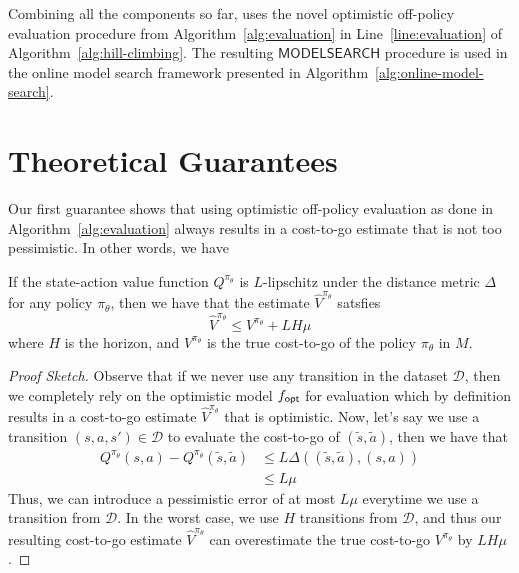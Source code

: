 Combining all the components so far, \taml{} uses the novel optimistic
off-policy evaluation procedure from Algorithm~\ref{alg:evaluation} in
Line~\ref{line:evaluation} of Algorithm~\ref{alg:hill-climbing}. The
resulting $\mathsf{MODELSEARCH}$ procedure is used in the online model
search framework presented in Algorithm~\ref{alg:online-model-search}.

\section{Theoretical Guarantees}
\label{sec:theor-guar}

Our first guarantee shows that using optimistic off-policy evaluation
as done in Algorithm~\ref{alg:evaluation} always results in a
cost-to-go estimate that is not too pessimistic. In other words, we
have
\begin{theorem}
  If the state-action value function $Q^{\pi_\theta}$ is $L$-lipschitz
  under the 
  distance metric $\Delta$ for any policy $\pi_\theta$, then we have
  that the estimate $\hat{V}^{\pi_\theta}$ satsfies
  \begin{equation}
    \label{eq:25}
    \hat{V}^{\pi_\theta} \leq V^{\pi_\theta} + LH\mu
  \end{equation}
  where $H$ is the horizon, and $V^{\pi_\theta}$ is the true
  cost-to-go of the policy $\pi_\theta$ in $M$.
  \label{theorem:lipschitz}
\end{theorem}
\begin{proof}[Proof Sketch]
  Observe that if we never use any transition in the dataset
  $\mathcal{D}$, then we completely rely on the optimistic model
  $f_\mathsf{opt}$ for evaluation which by definition results in a cost-to-go
  estimate $\hat{V}^{\pi_\theta}$ that is optimistic. Now, let's say
  we use a transition $(s, a, s') \in \mathcal{D}$ to evaluate the
  cost-to-go of $(\tilde{s}, \tilde{a})$, then we have that
  \begin{align*}
    Q^{\pi_\theta}(s, a) - Q^{\pi_\theta}(\tilde{s}, \tilde{a}) &\leq L\Delta((\tilde{s},
                              \tilde{a}), (s, a)) \\
    &\leq L\mu
  \end{align*}
  Thus, we can introduce a pessimistic error of at most $L\mu$
  everytime we use a transition from $\mathcal{D}$. In the worst case,
  we use $H$ transitions from $\mathcal{D}$, and thus our resulting
  cost-to-go estimate $\hat{V}^{\pi_\theta}$ can overestimate the true
  cost-to-go $V^{\pi_\theta}$ by $LH\mu$.
\end{proof}

